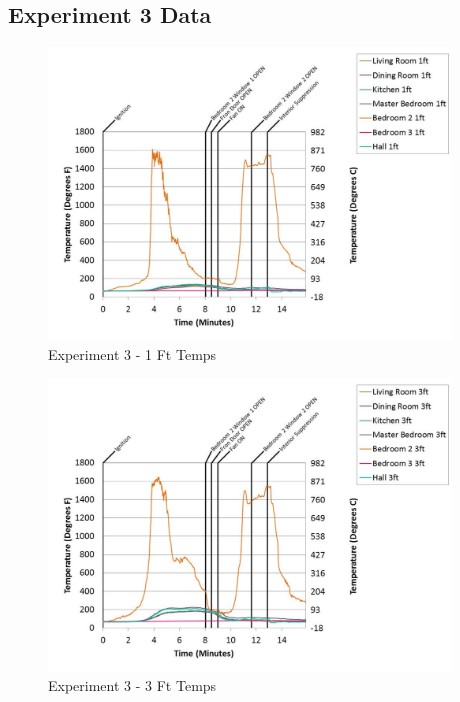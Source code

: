 \documentclass{article}
\begin{document}
\begin{appendices}
	\clearpage

		\clearpage
\clearpage		\large
\subsection{Experiment 3 Data} \label{App:Exp3Results} 

	\begin{figure}[h!]
		\centering
		\includegraphics[height=3.05in]{0_Images/Results_Charts/Exp_3_Charts/1FtTemps.pdf}
		\caption{Experiment 3 - 1 Ft Temps}
	\end{figure}
 

	\begin{figure}[h!]
		\centering
		\includegraphics[height=3.05in]{0_Images/Results_Charts/Exp_3_Charts/3FtTemps.pdf}
		\caption{Experiment 3 - 3 Ft Temps}
	\end{figure}
 
	\clearpage


\end{appendices}
\end{document}
